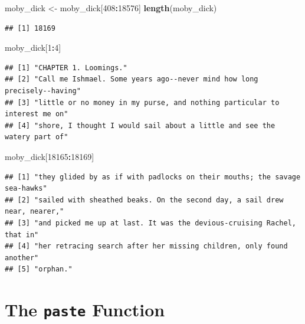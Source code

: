 \documentclass[
]{krantz}
\newenvironment{Shaded}{\begin{snugshade}}{\end{snugshade}}
\newcommand{\DecValTok}[1]{\textcolor[rgb]{0.00,0.00,0.81}{#1}}
\newcommand{\KeywordTok}[1]{\textcolor[rgb]{0.13,0.29,0.53}{\textbf{#1}}}
\newcommand{\NormalTok}[1]{#1}
\newcommand{\OperatorTok}[1]{\textcolor[rgb]{0.81,0.36,0.00}{\textbf{#1}}}
\newcommand{\StringTok}[1]{\textcolor[rgb]{0.31,0.60,0.02}{#1}}
\begin{document}
\begin{Shaded}
\begin{Highlighting}[]
\NormalTok{moby\_dick \textless{}{-}}\StringTok{ }\NormalTok{moby\_dick[}\DecValTok{408}\OperatorTok{:}\DecValTok{18576}\NormalTok{]}
\KeywordTok{length}\NormalTok{(moby\_dick)}
\end{Highlighting}
\end{Shaded}

\begin{verbatim}
## [1] 18169
\end{verbatim}

\begin{Shaded}
\begin{Highlighting}[]
\NormalTok{moby\_dick[}\DecValTok{1}\OperatorTok{:}\DecValTok{4}\NormalTok{]}
\end{Highlighting}
\end{Shaded}

\begin{verbatim}
## [1] "CHAPTER 1. Loomings."                                                    
## [2] "Call me Ishmael. Some years ago--never mind how long precisely--having"  
## [3] "little or no money in my purse, and nothing particular to interest me on"
## [4] "shore, I thought I would sail about a little and see the watery part of"
\end{verbatim}

\begin{Shaded}
\begin{Highlighting}[]
\NormalTok{moby\_dick[}\DecValTok{18165}\OperatorTok{:}\DecValTok{18169}\NormalTok{]}
\end{Highlighting}
\end{Shaded}

\begin{verbatim}
## [1] "they glided by as if with padlocks on their mouths; the savage sea-hawks"
## [2] "sailed with sheathed beaks. On the second day, a sail drew near, nearer,"
## [3] "and picked me up at last. It was the devious-cruising Rachel, that in"   
## [4] "her retracing search after her missing children, only found another"     
## [5] "orphan."
\end{verbatim}

\hypertarget{the-paste-function}{%
\section{\texorpdfstring{The \texttt{paste} Function}{The paste Function}}\label{the-paste-function}}
\end{document}

